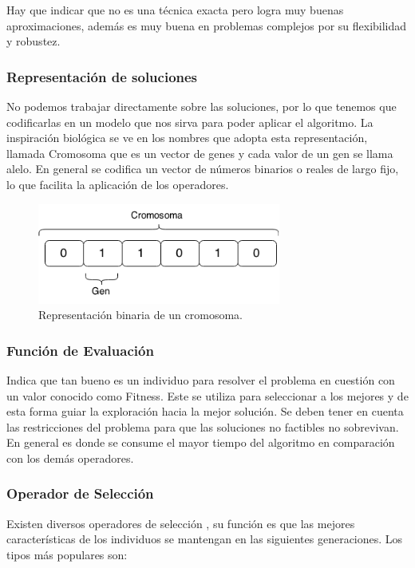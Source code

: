 Hay que indicar que no es una técnica exacta pero logra muy buenas aproximaciones, además es muy buena en problemas complejos por su flexibilidad y robustez. 


\subsubsection{Representación de soluciones}
No podemos trabajar directamente sobre las soluciones, por lo que tenemos que codificarlas en un modelo que nos sirva para poder aplicar el algoritmo.
La inspiración biológica se ve en los nombres que adopta esta representación, llamada Cromosoma que es un vector de genes y cada valor de un gen se llama alelo.
En general se codifica un vector de números binarios o reales de largo fijo, lo que facilita la aplicación de los operadores.

\begin{figure}[H]
	\centering
	\includegraphics[width=8cm]{Figures/rep_binaria}
	\caption{Representación binaria de un cromosoma.}
	\label{fig:rep_binaria}
\end{figure}


\subsubsection{Función de Evaluación} 
Indica que tan bueno es un individuo para resolver el problema en cuestión con un valor conocido como Fitness. Este se utiliza para seleccionar a los mejores y de esta forma guiar la exploración hacia la mejor solución.
Se deben tener en cuenta las restricciones del problema para que las soluciones no factibles no sobrevivan.
En general es donde se consume el mayor tiempo del algoritmo en comparación con los demás operadores.

\subsubsection{Operador de Selección}
Existen diversos operadores de selección , su función es que las mejores características de los individuos se mantengan en las siguientes generaciones.
Los tipos más populares son:

